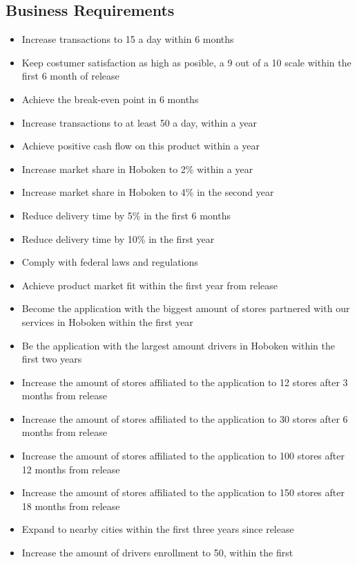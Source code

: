 \subsection{Business Requirements}
\begin{itemize}
    \item Increase transactions to 15 a day within 6 months
    \item Keep costumer satisfaction as high as posible, a 9 out of a 10 scale 
    within the first 6 month of release
    \item Achieve the break-even point in 6 months
    \item Increase transactions to at least 50 a day, within a year
    \item Achieve positive cash flow on this product within a year
    \item Increase market share in Hoboken to 2\% within a year
    \item Increase market share in Hoboken to 4\% in the second year
    \item Reduce delivery time by 5\% in the first 6 months
    \item Reduce delivery time by 10\% in the first year
    \item Comply with federal laws and regulations
    \item Achieve product market fit within the first year from release
    \item Become the application with the biggest amount of stores partnered 
    with our services in Hoboken within the first year
    \item Be the application with the largest amount drivers in Hoboken 
    within the first two years
    \item Increase the amount of stores affiliated to the application to 12 
    stores after 3 months from release
    \item Increase the amount of stores affiliated to the application to 30 
    stores after 6 months from release
    \item Increase the amount of stores affiliated to the application to 100 
    stores after 12 months from release
    \item Increase the amount of stores affiliated to the application to 150 
    stores after 18 months from release
    \item Expand to nearby cities within the first three years since release
    \item Increase the amount of drivers enrollment to 50, within the first 

\end{itemize}
